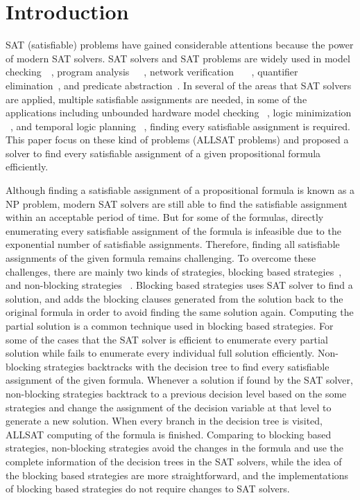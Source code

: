 \section{Introduction}
SAT (satisfiable) problems have gained considerable attentions because the power of modern SAT solvers. SAT solvers and SAT problems are widely used in model checking~\cite{bmc}~\cite{ic3}, program analysis~\cite{klee}~\cite{cpachecker}~\cite{cbmc}, network verification ~\cite{lopes2015checking}~\cite{majumdar2014kuai}~\cite{zhang2012verification}, quantifier elimination~\cite{brauer2011existential}, and predicate abstraction~\cite{lahiri2003symbolic}.
In several of the areas that SAT solvers are applied, multiple satisfiable assignments are needed, in some of the applications including unbounded hardware model checking ~\cite{car}, logic minimization ~\cite{sapra2003sat}, and temporal logic planning ~\cite{aalta}, finding every satisfiable assignment is required. This paper focus on these kind of problems (ALLSAT problems) and proposed a solver \tool to find every satisfiable assignment of a given propositional formula efficiently.

Although finding a satisfiable assignment of a propositional formula is known as a NP problem, modern SAT solvers are still able to find the satisfiable assignment within an acceptable period of time. But for some of the formulas, directly enumerating every satisfiable assignment of the formula is infeasible due to the exponential number of satisfiable assignments. Therefore, finding all satisfiable assignments of the given formula remains challenging.
To overcome these challenges, there are mainly two kinds of strategies, blocking based strategies~\cite{mcmillan2002applying}, and non-blocking strategies ~\cite{grumberg2004memory}. Blocking based strategies uses SAT solver to find a solution, and adds the blocking clauses generated from the solution back to the original formula in order to avoid finding the same solution again. Computing the partial solution is a common technique used in blocking based strategies. For some of the cases that the SAT solver is efficient to enumerate every partial solution while fails to enumerate every individual full solution efficiently. 
Non-blocking strategies backtracks with the decision tree to find every satisfiable assignment of the given formula. Whenever a solution if found by the SAT solver, non-blocking strategies backtrack to a previous decision level based on the some strategies and change the assignment of the decision variable at that level to generate a new solution. When every branch in the decision tree is visited, ALLSAT computing of the formula is finished. 
Comparing to blocking based strategies, non-blocking strategies avoid the changes in the formula and use the complete information of the decision trees in the SAT solvers, while the idea of the blocking based strategies are more straightforward, and the implementations of blocking based strategies do not require changes to SAT solvers.

